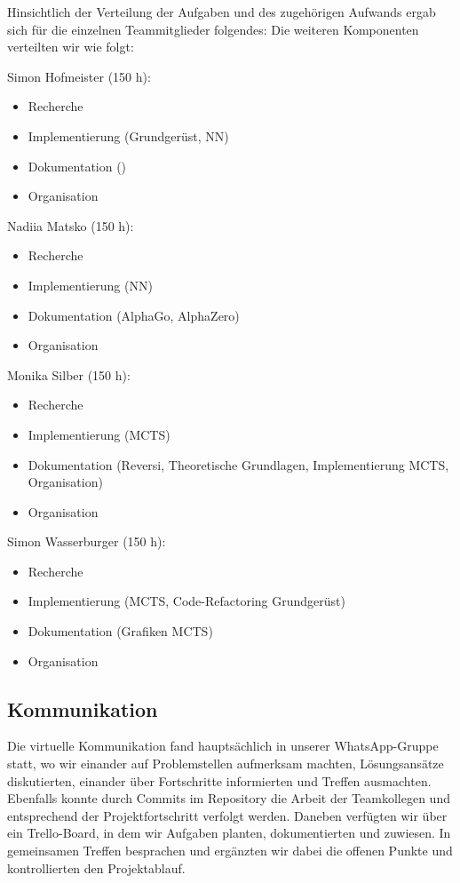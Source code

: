 \documentclass[12pt,a4paper]{article}
\begin{document}
Hinsichtlich der Verteilung der Aufgaben und des zugehörigen Aufwands ergab sich für die einzelnen Teammitglieder folgendes:
Die weiteren Komponenten verteilten wir wie folgt:

Simon Hofmeister (150 h):
\begin{itemize}
\item Recherche
\item Implementierung (Grundgerüst, NN)
\item Dokumentation ()
\item Organisation
\end{itemize}       

Nadiia Matsko (150 h): 
\begin{itemize}
\item Recherche
\item Implementierung (NN)
\item Dokumentation (AlphaGo, AlphaZero)
\item Organisation
\end{itemize}  

Monika Silber (150 h): 
\begin{itemize}
\item Recherche
\item Implementierung (MCTS)
\item Dokumentation (Reversi, Theoretische Grundlagen, Implementierung MCTS, Organisation)
\item Organisation
\end{itemize}  

Simon Wasserburger (150 h): 
\begin{itemize}
\item Recherche
\item Implementierung (MCTS, Code-Refactoring Grundgerüst)
\item Dokumentation (Grafiken MCTS)
\item Organisation
\end{itemize}  

\subsection{Kommunikation}
Die virtuelle Kommunikation fand hauptsächlich in unserer WhatsApp-Gruppe statt, wo wir einander auf Problemstellen aufmerksam machten, Lösungsansätze diskutierten, einander über Fortschritte informierten und Treffen ausmachten. Ebenfalls konnte durch Commits im Repository die Arbeit der Teamkollegen und entsprechend der Projektfortschritt verfolgt werden. Daneben verfügten wir über ein Trello-Board, in dem wir Aufgaben planten, dokumentierten und zuwiesen. In gemeinsamen Treffen besprachen und ergänzten wir dabei die offenen Punkte und kontrollierten den Projektablauf. 
\end{document}
